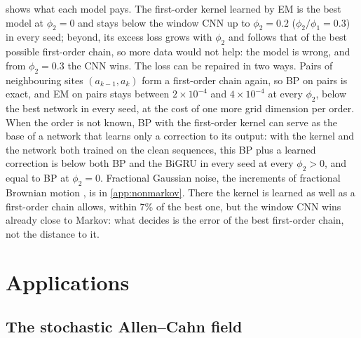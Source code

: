 \documentclass{article}
\begin{document}
 shows what each model pays. The first-order kernel learned by EM is the best model at $\phi_2=0$
and stays below the window CNN up to $\phi_2=0.2$ ($\phi_2/\phi_1=0.3$) in every seed; beyond, its excess loss grows
with $\phi_2$ and follows that of the best possible first-order chain, so more data would not help: the model is wrong,
and from $\phi_2=0.3$ the CNN wins. The loss can be repaired in two ways. Pairs of neighbouring sites
$(a_{k-1},a_k)$ form a first-order chain again, so BP on pairs is exact, and EM on pairs stays between $2\times10^{-4}$
and $4\times10^{-4}$ at every $\phi_2$, below the best network in every seed, at the cost of one more grid dimension
per order. When the order is not known, BP with the first-order kernel can serve as the base of a network that learns
only a correction to its output: with the kernel and the network both trained on the clean sequences, this BP plus a
learned correction is below both BP and the BiGRU in every seed at every $\phi_2>0$, and equal to BP at $\phi_2=0$. Fractional Gaussian noise, the increments of fractional Brownian motion \cite{mandelbrot1968fractional},
is in \cref{app:nonmarkov}. There the kernel is learned as well as a first-order chain allows, within 7\% of the best one, but the window CNN wins already close to Markov: what decides
is the error of the best first-order chain, not the distance to it.

\section{Applications}
\label{sec:applications}

\subsection{The stochastic Allen--Cahn field}
\label{sec:allen-cahn}
\end{document}
